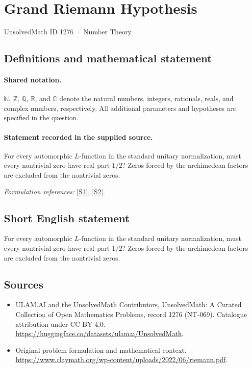 \documentclass[11pt]{article}
\newcommand{\sref}[2]{\hyperlink{source:#1:#2}{[S#2]}}
\begin{document}
\setcounter{section}{1275}
\section{Grand Riemann Hypothesis}\label{1276}
{\small UnsolvedMath ID 1276 · Number Theory}
\subsection{Definitions and mathematical statement}

\paragraph{Shared notation.}$\mathbb N$, $\mathbb Z$, $\mathbb Q$, $\mathbb R$, and $\mathbb C$ denote the natural numbers, integers, rationals, reals, and complex numbers, respectively. All additional parameters and hypotheses are specified in the question.


\paragraph{Statement recorded in the supplied source.}
For every automorphic $L$-function in the standard unitary normalization, must every nontrivial zero have real part $1/2$? Zeros forced by the archimedean factors are excluded from the nontrivial zeros.
\par\smallskip\textit{Formulation references:} \sref{1276}{1}, \sref{1276}{2}.
\subsection{Short English statement}
For every automorphic $L$-function in the standard unitary normalization, must every nontrivial zero have real part $1/2$? Zeros forced by the archimedean factors are excluded from the nontrivial zeros.
\subsection{Sources}
\begin{itemize}
\item[\hypertarget{source:1276:1}{S1}] ULAM.AI and the UnsolvedMath Contributors, UnsolvedMath: A Curated Collection of Open Mathematics Problems, record 1276 (NT-069). Catalogue attribution under CC BY 4.0.
\url{https://huggingface.co/datasets/ulamai/UnsolvedMath}.
\item[\hypertarget{source:1276:2}{S2}] Original problem formulation and mathematical context.
\url{https://www.claymath.org/wp-content/uploads/2022/06/riemann.pdf}.
\end{itemize}
\label{end:1276}
\end{document}
